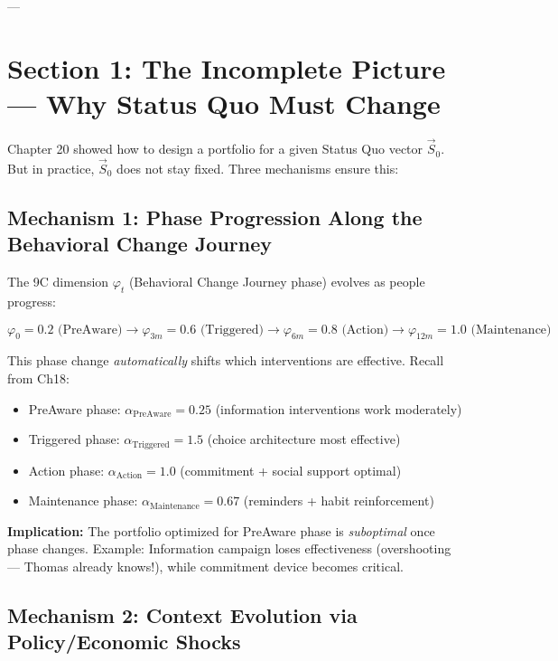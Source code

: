 ---

\section{Section 1: The Incomplete Picture — Why Status Quo Must Change}
\label{sec:21-motivation}

Chapter 20 showed how to design a portfolio for a given Status Quo vector $\vec{S}_0$. But in practice, $\vec{S}_0$ does not stay fixed. Three mechanisms ensure this:

\subsection{Mechanism 1: Phase Progression Along the Behavioral Change Journey}

The 9C dimension $\varphi_t$ (Behavioral Change Journey phase) evolves as people progress:

\begin{equation}
\varphi_0 = 0.2 \text{ (PreAware)} \to \varphi_{3m} = 0.6 \text{ (Triggered)} \to \varphi_{6m} = 0.8 \text{ (Action)} \to \varphi_{12m} = 1.0 \text{ (Maintenance)}
\label{eq:21-phase-progression}
\end{equation}

This phase change \textit{automatically} shifts which interventions are effective. Recall from Ch18:

\begin{itemize}[nosep]
\item PreAware phase: $\alpha_{\text{PreAware}} = 0.25$ (information interventions work moderately)
\item Triggered phase: $\alpha_{\text{Triggered}} = 1.5$ (choice architecture most effective)
\item Action phase: $\alpha_{\text{Action}} = 1.0$ (commitment + social support optimal)
\item Maintenance phase: $\alpha_{\text{Maintenance}} = 0.67$ (reminders + habit reinforcement)
\end{itemize}

\textbf{Implication:} The portfolio optimized for PreAware phase is \textit{suboptimal} once phase changes. Example: Information campaign loses effectiveness (overshooting — Thomas already knows!), while commitment device becomes critical.

\subsection{Mechanism 2: Context Evolution via Policy/Economic Shocks}

